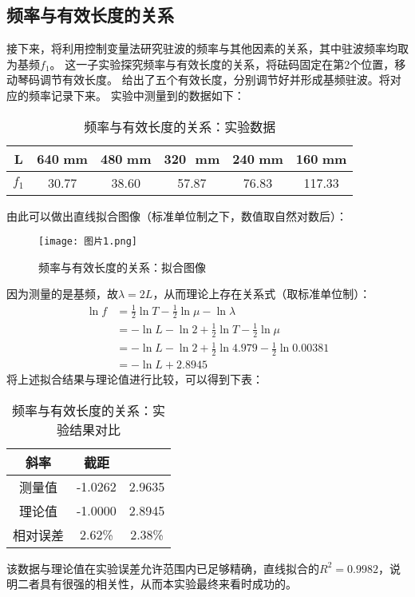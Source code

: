 \documentclass[11pt]{article}
\begin{document}
\subsection{频率与有效长度的关系}
接下来，将利用控制变量法研究驻波的频率与其他因素的关系，其中驻波频率均取为基频$f_1$。
这一子实验探究频率与有效长度的关系，将砝码固定在第2个位置，移动琴码调节有效长度。
给出了五个有效长度，分别调节好并形成基频驻波。将对应的频率记录下来。
实验中测量到的数据如下：
\begin{table}[H]
    \centering
    \caption{频率与有效长度的关系：实验数据}
    \begin{tabular}{cccccc}
        \toprule
        L & 640\,\,mm & 480\,\,mm & 320 \,\,mm& 240\,\,mm & 160\,\,mm \\ 
        \midrule
        $f_1$ & 30.77 & 38.60 & 57.87 & 76.83 & 117.33 \\ 
        \bottomrule
    \end{tabular}
\end{table}
由此可以做出直线拟合图像（标准单位制之下，数值取自然对数后）：
\begin{figure}[H]
    \centering
    \texttt{[image: 图片1.png]}
    \caption{频率与有效长度的关系：拟合图像}
\end{figure}
因为测量的是基频，故$\lambda=2L$，从而理论上存在关系式（取标准单位制）：
\begin{align*}
    \ln f&=\frac{1}{2}\ln T-\frac{1}{2}\ln \mu-\ln\lambda\\
    &=-\ln L-\ln 2+\frac{1}{2}\ln T-\frac{1}{2}\ln \mu \\
    &=-\ln L-\ln 2+\frac{1}{2}\ln 4.979-\frac{1}{2}\ln 0.00381\\
    &= -\ln L+2.8945
\end{align*}
将上述拟合结果与理论值进行比较，可以得到下表：
\begin{table}[H]
    \centering
    \caption{频率与有效长度的关系：实验结果对比}
    \begin{tabular}{ccc}
        \toprule
        斜率 & 截距 \\ 
        \midrule
        测量值 & -1.0262 & 2.9635 \\ 
        理论值 & -1.0000 & 2.8945 \\ 
        相对误差 & 2.62\% & 2.38\% \\ 
        \bottomrule
    \end{tabular}
\end{table}
该数据与理论值在实验误差允许范围内已足够精确，直线拟合的$R^2=0.9982$，说明二者具有很强的相关性，从而本实验最终来看时成功的。
\end{document}
